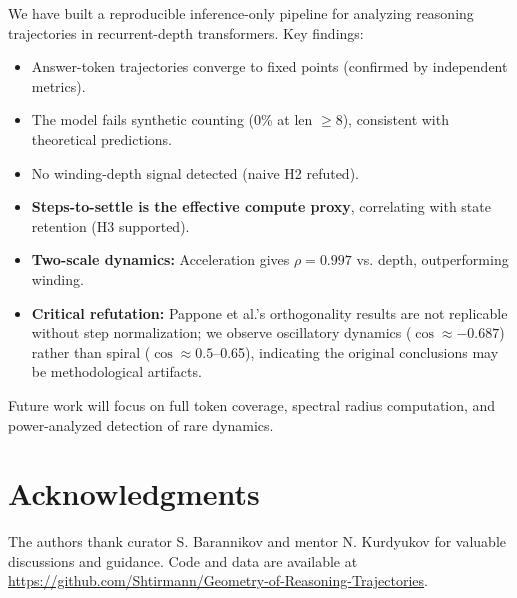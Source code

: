 We have built a reproducible inference-only pipeline for analyzing reasoning trajectories in recurrent-depth transformers. Key findings:

\begin{itemize}
    \item Answer-token trajectories converge to fixed points (confirmed by independent metrics).
    \item The model fails synthetic counting (0\% at len $\geq 8$), consistent with theoretical predictions.
    \item No winding-depth signal detected (naive H2 refuted).
    \item \textbf{Steps-to-settle is the effective compute proxy}, correlating with state retention (H3 supported).
    \item \textbf{Two-scale dynamics:} Acceleration gives $\rho = 0.997$ vs. depth, outperforming winding.
    \item \textbf{Critical refutation:} Pappone et al.'s orthogonality results are not replicable without step normalization; we observe oscillatory dynamics ($\cos \approx -0.687$) rather than spiral ($\cos \approx 0.5$--0.65), indicating the original conclusions may be methodological artifacts.
\end{itemize}

Future work will focus on full token coverage, spectral radius computation, and power-analyzed detection of rare dynamics.

\section*{Acknowledgments}
The authors thank curator S. Barannikov and mentor N. Kurdyukov for valuable discussions and guidance. Code and data are available at \url{https://github.com/Shtirmann/Geometry-of-Reasoning-Trajectories}.

